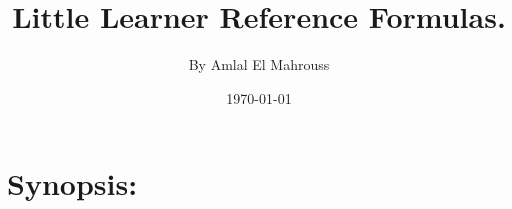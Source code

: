 \documentclass[10pt]{article}
\title{%
	\vspace{-1.5em}%
	\large\textbf{Little Learner Reference Formulas.}%
}
\author{By Amlal El Mahrouss}
\date{\today}
\theoremstyle{plain}
\theoremstyle{definition}
\theoremstyle{remark}
\begin{document}

\maketitle
\tableofcontents
\newpage

\section{Synopsis:}

\end{document}
